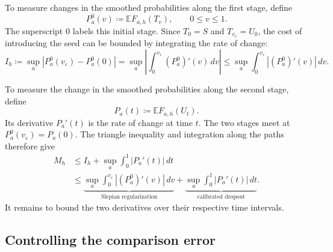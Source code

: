 \documentclass[11pt,letterpaper]{article}
\theoremstyle{remark}
\newcommand{\E}{\mathbb E}
\begin{document}
{
To measure changes in the smoothed probabilities along the first stage, {define}
\[
 P_a^0(v)\coloneqq\E F_{a,h}(T_v),\qquad 0\le v\le1.
\]
The superscript \(0\) labels this initial stage. Since
\(T_0=S\) and \(T_{v_\varepsilon}=U_0\), the cost of introducing the seed
can be bounded by integrating the rate of change:
\[
 I_h\coloneqq\sup_a|P_a^0(v_\varepsilon)-P_a^0(0)|
 =\sup_a\left|\int_0^{v_\varepsilon}(P_a^0)'(v)\,dv\right|
 \le\sup_a\int_0^{v_\varepsilon}|(P_a^0)'(v)|\,dv.
\]
}

{To measure the change in the smoothed probabilities along the
second stage, {define}}
\[
 P_a(t)\coloneqq\E F_{a,h}(U_t).
\]
{
Its derivative \(P_a'(t)\) is the rate of change at time \(t\).
The two stages meet at \(P_a^0(v_\varepsilon)=P_a(0)\).
The triangle inequality and integration along the paths therefore give
\begin{equation}
\begin{aligned}
 M_h&\le I_h+\sup_a\int_0^1|P_a'(t)|\,dt\\
 &\le
 \underbrace{\sup_a\int_0^{v_\varepsilon}|(P_a^0)'(v)|\,dv}
             _{\text{Slepian regularization}}
 +\underbrace{\sup_a\int_0^1|P_a'(t)|\,dt}
             _{\text{calibrated dropout}}.
\end{aligned}
\label{eq:roadmap}
\end{equation}
It remains to bound the two derivatives over their respective time intervals.
}

\subsection{Controlling the comparison error}
\label{sec:outline-seeded}
\end{document}
